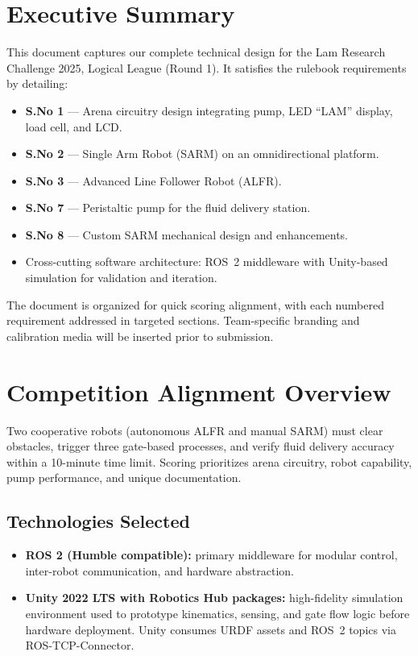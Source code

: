 \documentclass[12pt]{article}
\begin{document}
\section{Executive Summary}
This document captures our complete technical design for the Lam Research Challenge 2025, Logical League (Round 1). It satisfies the rulebook requirements by detailing:
\begin{itemize}
    \item \textbf{S.No 1} --- Arena circuitry design integrating pump, LED ``LAM'' display, load cell, and LCD.
    \item \textbf{S.No 2} --- Single Arm Robot (SARM) on an omnidirectional platform.
    \item \textbf{S.No 3} --- Advanced Line Follower Robot (ALFR).
    \item \textbf{S.No 7} --- Peristaltic pump for the fluid delivery station.
    \item \textbf{S.No 8} --- Custom SARM mechanical design and enhancements.
    \item Cross-cutting software architecture: ROS~2 middleware with Unity-based simulation for validation and iteration.
\end{itemize}
The document is organized for quick scoring alignment, with each numbered requirement addressed in targeted sections. Team-specific branding and calibration media will be inserted prior to submission.

\section{Competition Alignment Overview}
Two cooperative robots (autonomous ALFR and manual SARM) must clear obstacles, trigger three gate-based processes, and verify fluid delivery accuracy within a 10-minute time limit. Scoring prioritizes arena circuitry, robot capability, pump performance, and unique documentation.

\subsection{Technologies Selected}
\begin{itemize}
    \item \textbf{ROS 2 (Humble compatible):} primary middleware for modular control, inter-robot communication, and hardware abstraction.
    \item \textbf{Unity 2022 LTS with Robotics Hub packages:} high-fidelity simulation environment used to prototype kinematics, sensing, and gate flow logic before hardware deployment. Unity consumes URDF assets and ROS~2 topics via ROS-TCP-Connector.
\end{itemize}
\end{document}
